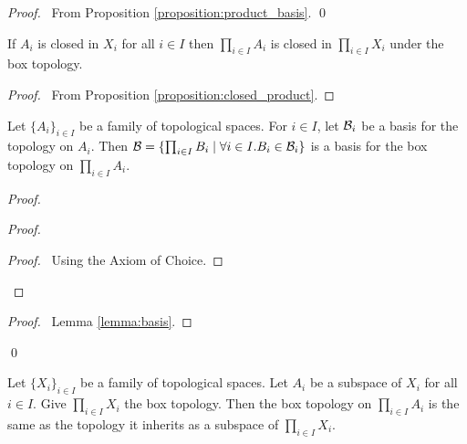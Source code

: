 \begin{proof}
    \pf\ From Proposition \ref{proposition:product_basis}. \qed
\end{proof}

\begin{corollary}
    \label{corollary:closed_box}
        If $A_i$ is closed in $X_i$ for all $i \in I$ then $\prod_{i \in I} A_i$ is closed in $\prod_{i \in I} X_i$ under the box topology.    
\end{corollary}

\begin{proof}
    \pf\ From Proposition \ref{proposition:closed_product}.
\end{proof}

\begin{proposition}[AC]
    Let $\{ A_i \}_{i \in I}$ be a family of topological spaces. For $i \in I$, let $\mathcal{B}_i$ be a basis for the topology on $A_i$. Then $\mathcal{B} = \{ \prod_{i \in I} B_i \mid
    \forall i \in I. B_i \in \mathcal{B}_i \}$ is a basis for the box topology on $\prod_{i \in I} A_i$.
\end{proposition}

\begin{proof}
    \pf
    \begin{proof}
        \begin{proof}
            \pf\ Using the Axiom of Choice.
        \end{proof}
    \end{proof}
    \qedstep
    \begin{proof}
        \pf\ Lemma \ref{lemma:basis}.
    \end{proof}
    \qed
\end{proof}

\begin{theorem}
    Let $\{ X_i \}_{i \in I}$ be a family of topological spaces. Let $A_i$ be a subspace of $X_i$ for all $i \in I$.
    Give $\prod_{i \in I} X_i$ the box topology.
    Then the box topology on $\prod_{i \in I} A_i$ is the same as the topology it inherits as a subspace of
    $\prod_{i \in I} X_i$.
\end{theorem}

